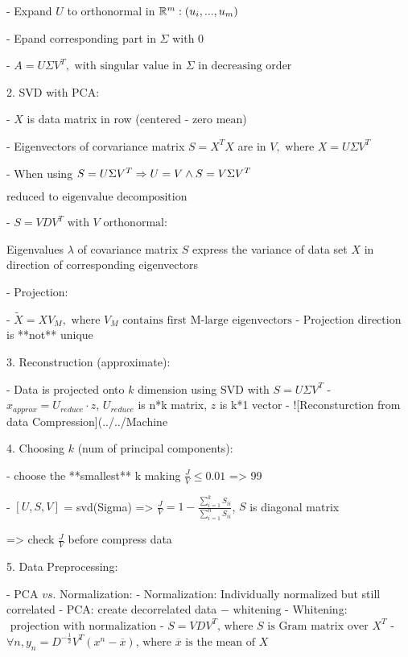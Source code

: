 - Expand $U$ to orthonormal in $\mathbb R^m: \space (u_i,...,u_m)$ 

- Epand corresponding part in $\Sigma$ with $0$ 

- \(A = U\Sigma V^T,\text{ with singular value in $\Sigma$ in decreasing order}\)

2. SVD with PCA:

- $X$ is data matrix in row ($\text{centered - zero mean}$)

- Eigenvectors of corvariance matrix $S=X^TX$ are in $V, \text{ where }X = U\Sigma V^T$ 

- When using $S=U\Sigma V^T \Rightarrow \space U=V \space \land \space S=V\Sigma V^T$ 

	$\text{reduced to eigenvalue decomposition}$ 

- $S=VDV^T \text{ with $V$ orthonormal}$: 

Eigenvalues $\lambda$ of covariance matrix $S$ express the variance of data set $X$ in direction of corresponding eigenvectors

- Projection:

- $\widetilde X = XV_M, \text{ where $V_M$ contains first M-large eigenvectors}$ 
- Projection direction is **not** unique 

3. Reconstruction (approximate): 

- Data is projected onto $k$ dimension using $\text{SVD}$ with $S = U\Sigma V^T$ 
- $x_{approx} = U_{reduce} \cdot z$,  $U_{reduce}$ is n*k matrix, $z$ is k*1 vector
- ![Reconsturction from data Compression](../../Machine%

4. Choosing $k$ (num of principal components):

- choose the **smallest** k making $\displaystyle \frac JV \leq 0.01$ => 99%

- $[U,S,V]$ = svd(Sigma) => $\displaystyle \frac JV=1-\frac {\sum^k_{i=1}S_{ii}}{\sum^n_{i=1}S_{ii}}$, $S$ is diagonal matrix

=> check $\frac JV$ before compress data 

5. Data Preprocessing:

- PCA $vs.$ Normalization:
- Normalization: Individually normalized but still correlated
- PCA: create decorrelated data $-\text{ whitening}$ 
- Whitening: $\text{ projection with normalization}$ 
- $S = VDV^T \text{, where $S$ is Gram matrix over $X^T$}$ 
- \(\forall n, y_n=D^{-\frac12}V^T(x^n-\overline x) \text{, where $\overline x$ is the mean of $X$}\) 

